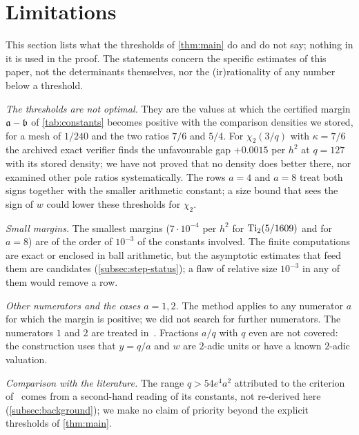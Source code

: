 \section{Limitations}\label{sec:limitations}

This section lists what the thresholds of \cref{thm:main} do and do not say; nothing in it is used in
the proof. The statements concern the specific estimates of this paper, not the determinants
themselves, nor the (ir)rationality of any number below a threshold.

\emph{The thresholds are not optimal.} They are the values at which the certified margin
$\mathfrak{a}-\mathfrak{b}$ of \cref{tab:constants} becomes positive with the comparison densities we
stored, for a mesh of $1/240$ and the two ratios $7/6$ and $5/4$. For $\chi_2(3/q)$ with
$\kappa=7/6$ the archived exact verifier finds the unfavourable gap $+0.0015$ per $h^2$ at $q=127$
with its stored density; we have not proved that no density does better there, nor examined other
pole ratios systematically. The rows $a=4$ and $a=8$ treat both signs together with the smaller
arithmetic constant; a size bound that sees the sign of $w$ \cite[Remark~6.7]{Krisman2026chi2}
could lower these thresholds for $\chi_2$.

\emph{Small margins.} The smallest margins ($7\cdot10^{-4}$ per $h^2$ for $\operatorname{Ti}_2(5/1609)$ and
for $a=8$) are of the order of $10^{-3}$ of the constants involved. The finite computations are
exact or enclosed in ball arithmetic, but the asymptotic estimates that feed them are candidates
(\cref{subsec:step-status}); a flaw of relative size $10^{-3}$ in any of them would remove a row.

\emph{Other numerators and the cases $a=1,2$.} The method applies to any numerator $a$ for
which the margin is positive; we did not search for further numerators. The numerators $1$ and $2$
are treated in~\cite{Krisman2026chi2,AxiomForge2026numeratorTwo}. Fractions $a/q$ with $q$ even are not
covered: the construction uses that $y=q/a$ and $w$ are $2$-adic units or have a known $2$-adic
valuation.

\emph{Comparison with the literature.} The range $q>54e^4a^2$ attributed to the criterion
of~\cite{DHK2022Acta} comes from a second-hand reading of its constants, not re-derived here
(\cref{subsec:background}); we make no claim of priority beyond the explicit thresholds of
\cref{thm:main}.

